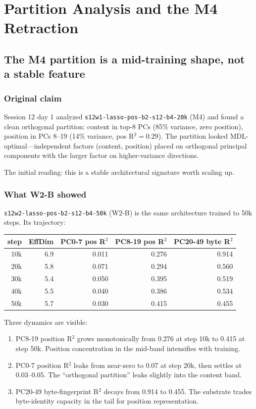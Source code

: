 \documentclass[11pt,openany]{book}
\begin{document}
\part{Partition Analysis and the M4 Retraction}

\chapter{The M4 partition is a mid-training shape, not a stable feature}
\label{ch:m4-retraction}

\section{Original claim}

Session 12 day 1 analyzed \texttt{s12w1-lasso-pos-b2-s12-b4-20k} (M4) and
found a clean orthogonal partition: content in top-8 PCs (85\% variance,
zero position), position in PCs 8--19 (14\% variance, pos R$^2=0.29$). The
partition looked MDL-optimal---independent factors (content, position)
placed on orthogonal principal components with the larger factor on
higher-variance directions.

The initial reading: this is a stable architectural signature worth scaling
up.

\section{What W2-B showed}

\texttt{s12w2-lasso-pos-b2-s12-b4-50k} (W2-B) is the same architecture trained
to 50k steps. Its trajectory:

\begin{longtable}{rrrrr}
\toprule
step & EffDim & PC0-7 pos R$^2$ & PC8-19 pos R$^2$ & PC20-49 byte R$^2$ \\
\midrule
10k & 6.9 & 0.011 & 0.276 & 0.914 \\
20k & 5.8 & 0.071 & 0.294 & 0.560 \\
30k & 5.4 & 0.050 & 0.395 & 0.519 \\
40k & 5.5 & 0.040 & 0.386 & 0.534 \\
50k & 5.7 & 0.030 & 0.415 & 0.455 \\
\bottomrule
\end{longtable}

Three dynamics are visible:
\begin{enumerate}
  \item PC8-19 position R$^2$ grows monotonically from 0.276 at step 10k
  to 0.415 at step 50k. Position concentration in the mid-band intensifies
  with training.
  \item PC0-7 position R$^2$ leaks from near-zero to 0.07 at step 20k, then
  settles at 0.03--0.05. The ``orthogonal partition'' leaks slightly into
  the content band.
  \item PC20-49 byte-fingerprint R$^2$ decays from 0.914 to 0.455. The
  substrate trades byte-identity capacity in the tail for position
  representation.
\end{enumerate}
\end{document}
